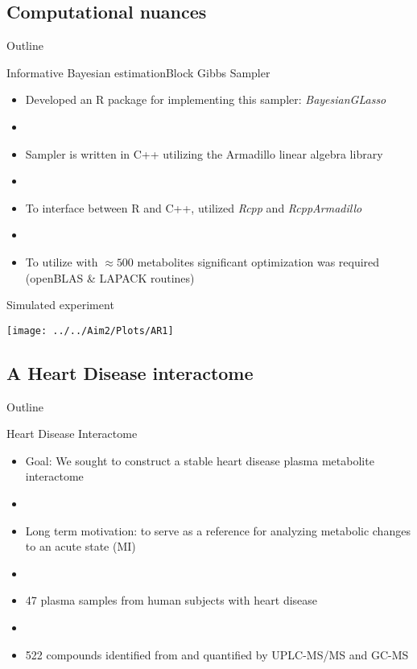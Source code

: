 \documentclass[xcolor=dvipsnames]{beamer}
\begin{document}
\subsection{Computational nuances}
\begin{frame}{Outline}
	\vspace{-10.5pt}
	\tableofcontents[currentsection,subsectionstyle=show/shaded/hide]
\end{frame}
\begin{frame}{Informative Bayesian estimation}{Block Gibbs Sampler}
	\vspace{-15.5pt}
	\begin{itemize}
		\item Developed an R package for implementing this sampler: \emph{BayesianGLasso} \pause
		\item[]
		\item Sampler is written in C++ utilizing the Armadillo linear algebra library \pause
		\item[]
		\item To interface between R and C++, utilized \emph{Rcpp} and \emph{RcppArmadillo} \pause
		\item[]
		\item To utilize with $\approx 500$ metabolites significant optimization was required (openBLAS \& LAPACK routines)
	\end{itemize}
\end{frame}

\begin{frame}{Simulated experiment}
	\begin{center}
		\texttt{[image: ../../Aim2/Plots/AR1]}
	\end{center}
\end{frame}

\subsection{A Heart Disease interactome}
\begin{frame}{Outline}
	\vspace{-10.5pt}
	\tableofcontents[currentsection,subsectionstyle=show/shaded/hide]
\end{frame}
\begin{frame}{Heart Disease Interactome}
	\vspace{-15.5pt}
	\begin{itemize}
		\item Goal: We sought to construct a stable heart disease plasma metabolite interactome \pause
		\item[]
		\item Long term motivation:  to serve as a reference for analyzing metabolic changes to an acute state (MI) \pause
		\item[]
		\item 47 plasma samples from human subjects with heart disease \pause
		\item[]
		\item 522 compounds identified from and quantified by UPLC-MS/MS and GC-MS
	\end{itemize}
\end{frame}
\end{document}
